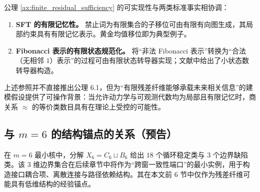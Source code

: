 公理 \ref{ax:finite_residual_sufficiency} 的可实现性与两类标准事实相协调：

\begin{enumerate}
  \item \textbf{SFT 的有限记忆性。} 禁止词为有限集合的子移位可由有限有向图生成，其局部约束具有有限记忆表示。黄金均值移位即为典型例子。\cite{scholarpedia_symbolic_dynamics}
  \item \textbf{Fibonacci 表示的有限状态规范化。} 将“非法 Fibonacci 表示”转换为“合法（无相邻 $1$）表示”的过程可由有限状态转导器实现；文献中给出了小状态数转导器构造。\cite{shallit_robbins_ardila_berstel}
\end{enumerate}

上述参照并不直接推出公理 6.1，但为“有限残差纤维能够承载未来相关信息”的建模假设提供了可操作背景：当允许动力学与可观测代数均为局部且有限记忆时，商关系 $\approx$ 的等价类数目具有在理论上受控的可能性。

\subsection{\texorpdfstring{与 $m=6$ 的结构锚点的关系（预告）}{与 m=6 的结构锚点的关系（预告）}}

在 $m=6$ 最小核中，分解 $X_6=C_6\sqcup B_6$ 给出 $18$ 个循环稳定类与 $3$ 个边界缺陷类。该 $3$ 维边界集合在后续章节中将作为“跨窗一致性端口”的最小实例，用于构造接口耦合项、离散连接与路径依赖结构。其在本文前 6 节中仅作为残差纤维可能具有低维结构的经验锚点。
